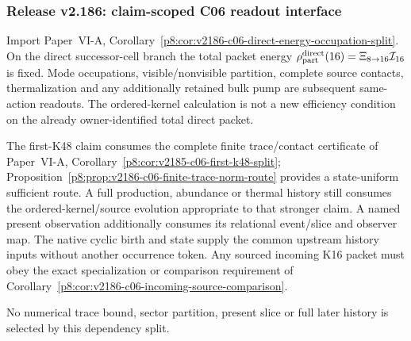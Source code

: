 \documentclass[12pt,a4paper]{article}
\begin{document}
\subsubsection{Release v2.186: claim-scoped C06 readout interface}
\label{p9:sec:v2186-c06-claim-scoped-readouts}
\begin{corollary}
\label{p9:cor:v2186-c06-direct-energy-readout}
Import Paper~VI-A,
Corollary~\ref{p8:cor:v2186-c06-direct-energy-occupation-split}.
On the direct successor-cell branch the total packet energy
$\rho_{\rm part}^{\rm direct}(16)=\Xi_{8\to16}\mathcal I_{16}$ is fixed.
Mode occupations, visible/nonvisible partition, complete source contacts,
thermalization and any additionally retained bulk pump are subsequent
same-action readouts. The ordered-kernel calculation is not a new efficiency
condition on the already owner-identified total direct packet.
\end{corollary}

\begin{corollary}
\label{p9:cor:v2186-c06-three-scope-readout}
The first-K48 claim consumes the complete finite trace/contact certificate of
Paper~VI-A, Corollary~\ref{p8:cor:v2185-c06-first-k48-split};
Proposition~\ref{p8:prop:v2186-c06-finite-trace-norm-route} provides a
state-uniform sufficient route. A full production, abundance or thermal
history still consumes the ordered-kernel/source evolution appropriate to
that stronger claim. A named present observation additionally consumes its
relational event/slice and observer map. The native cyclic birth and state
supply the common upstream history inputs without another occurrence token.
Any sourced incoming K16 packet must obey the exact specialization or
comparison requirement of
Corollary~\ref{p8:cor:v2186-c06-incoming-source-comparison}.
\end{corollary}
No numerical trace bound, sector partition, present slice or full later
history is selected by this dependency split.




\end{document}
